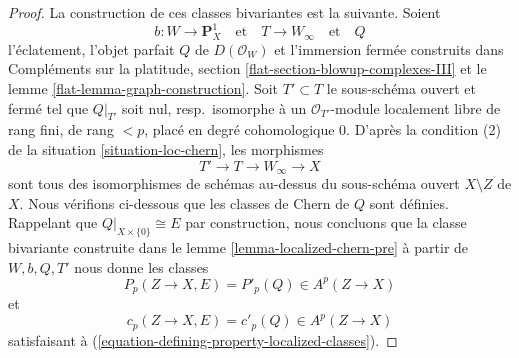\begin{proof}
La construction de ces classes bivariantes est la suivante. Soient
$$
b : W \longrightarrow \mathbf{P}^1_X
\quad\text{et}\quad
T \longrightarrow W_\infty
\quad\text{et}\quad
Q
$$
l'éclatement, l'objet parfait $Q$ de $D(\mathcal{O}_W)$
et l'immersion fermée construits dans
Compléments sur la platitude, section \ref{flat-section-blowup-complexes-III}
et le lemme \ref{flat-lemma-graph-construction}.
Soit $T' \subset T$ le sous-schéma ouvert et fermé tel que
$Q|_{T'}$ soit nul, resp.\ isomorphe à un
$\mathcal{O}_{T'}$-module localement libre de rang fini, de rang $< p$,
placé en degré cohomologique $0$. D'après la condition (2) de la
situation \ref{situation-loc-chern}, les morphismes
$$
T' \to T \to W_\infty \to X
$$
sont tous des isomorphismes de schémas au-dessus du sous-schéma ouvert $X \setminus Z$ de $X$.
Nous vérifions ci-dessous que les classes de Chern de $Q$ sont définies.
Rappelant que $Q|_{X \times \{0\}} \cong E$ par construction, nous concluons
que la classe bivariante construite dans le lemme \ref{lemma-localized-chern-pre}
à partir de $W, b, Q, T'$ nous donne les classes
$$
P_p(Z \to X, E) = P'_p(Q) \in A^p(Z \to X)
$$
et
$$
c_p(Z \to X, E) = c'_p(Q) \in A^p(Z \to X)
$$
satisfaisant à (\ref{equation-defining-property-localized-classes}).


\end{proof}
